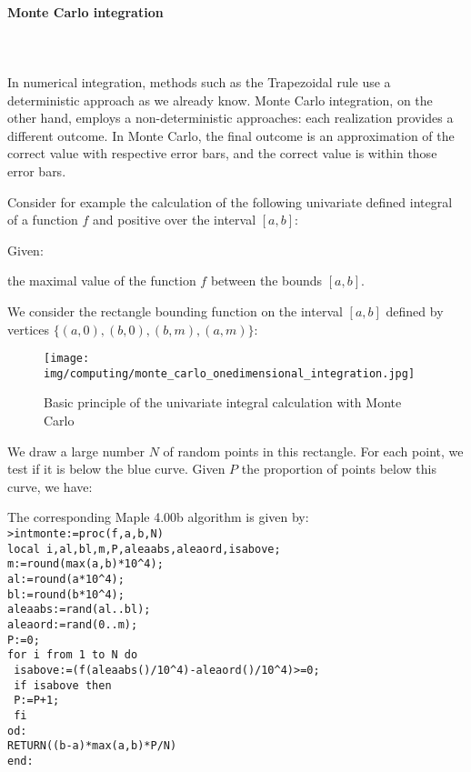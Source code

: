 	\pagebreak
	\paragraph{Monte Carlo integration}\mbox{}\\\\
	In numerical integration, methods such as the Trapezoidal rule use a deterministic approach as we already know. Monte Carlo integration, on the other hand, employs a non-deterministic approaches: each realization provides a different outcome. In Monte Carlo, the final outcome is an approximation of the correct value with respective error bars, and the correct value is within those error bars.
	
	Consider for example the calculation of the following univariate defined integral of a function $f$ and positive over the interval $[a, b]$:
	
	Given:
	
	the maximal value of the function $f$ between the bounds $[a,b]$.

	We consider the rectangle bounding function on the interval $[a, b]$ defined by vertices $\{(a,0),(b,0),(b,m),(a,m)\}$:
	\begin{figure}[H]
		\centering
		\texttt{[image: img/computing/monte\_carlo\_onedimensional\_integration.jpg]}
		\caption{Basic principle of the univariate integral calculation with Monte Carlo}
	\end{figure}
	We draw a large number $N$ of random points in this rectangle. For each point, we test if it is below the blue curve. Given $P$ the proportion of points below this curve, we have:
	
	The corresponding Maple 4.00b algorithm  is given by:\\
	
	\texttt{>intmonte:=proc(f,a,b,N)}\\
	\texttt{local i,al,bl,m,P,aleaabs,aleaord,isabove;}\\
	\texttt{m:=round(max(a,b)*10\string^4);}\\
	\texttt{al:=round(a*10\string^4);}\\
	\texttt{bl:=round(b*10\string^4);}\\
	\texttt{aleaabs:=rand(al..bl);}\\
	\texttt{aleaord:=rand(0..m);}\\
	\texttt{P:=0;}\\
	\texttt{for i from 1 to N do}\\
	\texttt{     isabove:=(f(aleaabs()/10\string^4)-aleaord()/10\string^4)>=0;}\\
	\texttt{     if isabove then}\\
	\texttt{          P:=P+1;}\\
	\texttt{     fi}\\
	\texttt{od:}\\
	\texttt{RETURN((b-a)*max(a,b)*P/N)}\\
	\texttt{end:}\\
	
